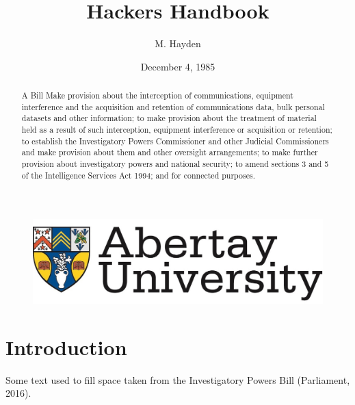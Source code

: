 \documentclass[12pt,a4paper]{article}
\title{Hackers Handbook}
\author{M. Hayden}
\affil{BSc Ethical Hacking\\
		Abertay University\\
		Dundee, United Kingdom\\
		StudentNumber@abertay.ac.uk}
\date{December 4, 1985}
\begin{document}

	\begin{figure}
		\includegraphics[width=\linewidth]{img/unilogo}
	\end{figure}

	\maketitle

	\newpage				
		\begin{abstract}
		 A Bill Make provision about the interception of communications, equipment
interference and the acquisition and retention of communications data, bulk
personal datasets and other information; to make provision about the
treatment of material held as a result of such interception, equipment
interference or acquisition or retention; to establish the Investigatory Powers
Commissioner and other Judicial Commissioners and make provision about
them and other oversight arrangements; to make further provision about
investigatory powers and national security; to amend sections 3 and 5 of the
Intelligence Services Act 1994; and for connected purposes.			
			
		\end{abstract}

	\newpage
	\tableofcontents
	\newpage
				
		

	\section{Introduction}
		 Some text used to fill space taken from the Investigatory Powers Bill (Parliament, 2016).
		
\end{document}
